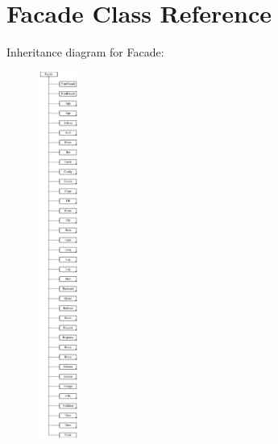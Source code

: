 \section{Facade Class Reference}
\label{class_illuminate_1_1_support_1_1_facades_1_1_facade}
Inheritance diagram for Facade\+:\begin{figure}[H]
\begin{center}
\leavevmode
\includegraphics[height=12.000000cm]{class_illuminate_1_1_support_1_1_facades_1_1_facade}
\end{center}
\end{figure}
